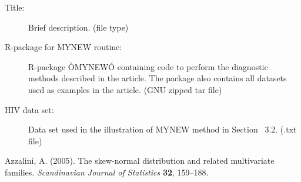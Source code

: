 \documentclass[12pt]{article}
\begin{document}
\begin{description}

\item[Title:] Brief description. (file type)

\item[R-package for  MYNEW routine:] R-package ÒMYNEWÓ containing code to perform the diagnostic methods described in the article. The package also contains all datasets used as examples in the article. (GNU zipped tar file)

\item[HIV data set:] Data set used in the illustration of MYNEW method in Section~ 3.2. (.txt file)

\end{description}

\begin{thebibliography}{}

Azzalini, A. (2005).
\newblock The skew-normal distribution and related multivariate families.
\newblock \emph{Scandinavian Journal of Statistics} \textbf{32}, 159--188.

\end{thebibliography}{}
\end{document}
